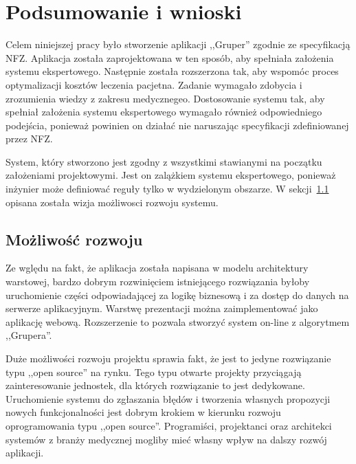 \chapter{Podsumowanie i wnioski}
\label{cha:podsumowanie}

Celem niniejszej pracy było stworzenie aplikacji ,,Gruper'' zgodnie ze specyfikacją NFZ. Aplikacja została zaprojektowana w ten sposób, aby spełniała założenia systemu ekspertowego. Następnie została rozszerzona tak, aby wspomóc proces optymalizacji kosztów leczenia pacjetna. Zadanie wymagało zdobycia i zrozumienia wiedzy z zakresu medycznegeo. Dostosowanie systemu tak, aby spełniał założenia systemu ekspertowego wymagało również odpowiedniego podejścia, ponieważ powinien on działać nie naruszając specyfikacji zdefiniowanej przez NFZ.

System, który stworzono jest zgodny z wszystkimi stawianymi na początku założeniami projektowymi. Jest on zalążkiem systemu ekspertowego, ponieważ inżynier może definiować reguły tylko w wydzielonym obszarze. W sekcji~\ref{sec:mozliwoscRozwoju} opisana została wizja możliwosci rozwoju systemu.


\section{Możliwość rozwoju}
\label{sec:mozliwoscRozwoju}

Ze wględu na fakt, że aplikacja została napisana w modelu architektury warstowej, bardzo dobrym rozwinięciem istniejącego rozwiązania byłoby uruchomienie części odpowiadającej za logikę biznesową i za dostęp do danych na serwerze aplikacyjnym. Warstwę prezentacji można zaimplementować jako aplikację webową. Rozszerzenie to pozwala stworzyć system on-line z algorytmem ,,Grupera''.

Duże możliwości rozwoju projektu sprawia fakt, że jest to jedyne rozwiązanie typu ,,open source'' na rynku. Tego typu otwarte projekty przyciągają zainteresowanie jednostek, dla których rozwiązanie to jest dedykowane. Uruchomienie systemu do zgłaszania błędów i tworzenia własnych propozycji nowych funkcjonalności jest dobrym krokiem w kierunku rozwoju oprogramowania typu ,,open source''. Programiści, projektanci oraz architekci systemów z branży medycznej mogliby mieć własny wpływ na dalszy rozwój aplikacji.

